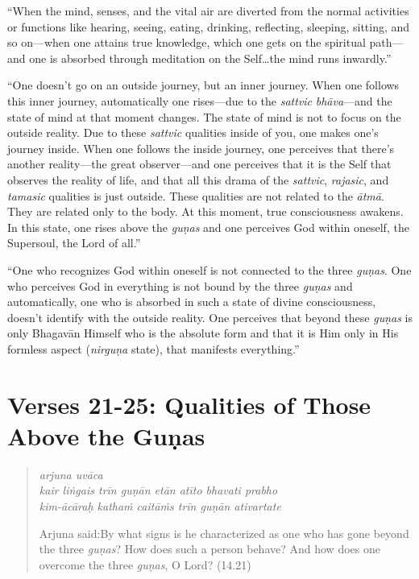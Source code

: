 \documentclass[12pt, twoside, openright]{memoir}
\begin{document}
\enquote{When the mind, senses, and the vital air are diverted from the normal activities or functions like hearing, seeing, eating, drinking, reflecting, sleeping, sitting, and so on---when one attains true knowledge, which one gets on the spiritual path---and one is absorbed through meditation on the Self\ldots the mind runs inwardly.}

\enquote{One doesn’t go on an outside journey, but an inner journey. When one follows this inner journey, automatically one rises---due to the \textit{sattvic} \textit{bhāva}---and the state of mind at that moment changes. The state of mind is not to focus on the outside reality. Due to these \textit{sattvic} qualities inside of you, one makes one’s journey inside. When one follows the inside journey, one perceives that there’s another reality---the great observer---and one perceives that it is the Self that observes the reality of life, and that all this drama of the \textit{sattvic}, \textit{rajasic}, and \textit{tamasic} qualities is just outside. These qualities are not related to the \textit{ātmā}. They are related only to the body. At this moment, true consciousness awakens. In this state, one rises above the \textit{guṇas} and one perceives God within oneself, the Supersoul, the Lord of all.}

\enquote{One who recognizes God within oneself is not connected to the three \textit{guṇas}. One who perceives God in everything is not bound by the three \textit{guṇas} and automatically, one who is absorbed in such a state of divine consciousness, doesn’t identify with the outside reality. One perceives that beyond these \textit{guṇas} is only Bhagavān Himself who is the absolute form and that it is Him only in His formless aspect (\textit{nirguṇa} state), that manifests everything.}

\section{Verses 21-25: Qualities of Those Above the Guṇas}\label{sec-verses-21-25-qualities-of-those-above-the-gunas}


\par
\begin{verse}
\textit{arjuna uvāca} \\
\textit{kair liṅgais trīn guṇān etān atīto bhavati prabho} \\
\textit{kim-ācāraḥ kathaṁ caitāṁs trīn guṇān ativartate}

\noindent \quad Arjuna said:\linebreak By what signs is he characterized as one who has gone beyond the three \textit{guṇas}? How does such a person behave? And how does one overcome the three \textit{guṇas}, O Lord? (14.21)
\end{verse}
\par
\end{document}
